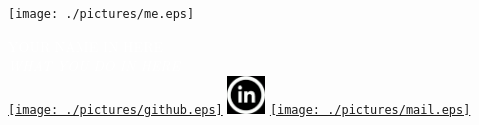 \documentclass[11pt, oneside, a4paper,titlepage]{article}
\title{%
  }
\date{}
\begin{document}

\begin{tcolorbox}
  \begin{minipage}{4.5cm}
    \hspace*{-0.3cm}\texttt{[image: ./pictures/me.eps]}
  \end{minipage}
  \begin{minipage}{15cm}
    \begin{center}
      \Huge{\textcolor{white}{YOUR NAME IN HERE}} \\
      \vspace*{0.5cm}
      \Large{\textcolor{white}{\emph{WHAT YOU DO IN HERE}}} \\ 
      \vspace*{0.5cm}
      \hspace*{-0.3cm}\href{https://github.com/danifreflow}{\texttt{[image: ./pictures/github.eps]}}
      \quad
      \hspace*{-0.3cm}\href{%
        }{\includegraphics[width=1cm]{./pictures/linkedIn.eps}}
      \quad
      \hspace*{-0.3cm}\href{mailto:%
      }{\texttt{[image: ./pictures/mail.eps]}}

    \end{center}
  \end{minipage}
\end{tcolorbox}
\end{document}
